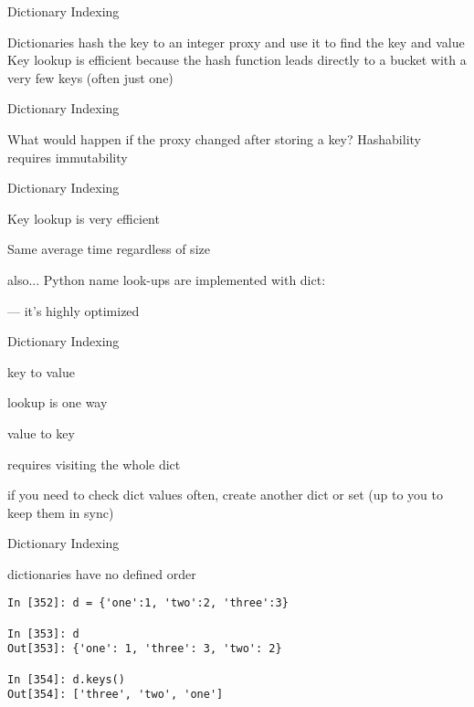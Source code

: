 \documentclass{beamer}
\begin{document}
\begin{frame}[fragile]{Dictionary Indexing}

\vfill
{\Large
Dictionaries hash the key to an integer proxy and use it to find the key and value
}
\vfill
{\Large
Key lookup is efficient because the hash function leads directly to a bucket with a very few keys (often just one)
}
\vfill
\end{frame} 

\begin{frame}[fragile]{Dictionary Indexing}

\vfill
{\Large
What would happen if the proxy changed after storing a key?
}
\vfill
{\Large
Hashability requires immutability}
\vfill
\end{frame} 

\begin{frame}[fragile]{Dictionary Indexing}

\vfill
{\Large

Key lookup is very efficient

\vfill
Same average time regardless of size
}

\vfill
also... Python name look-ups are implemented with dict:

 --- it’s highly optimized
\end{frame} 


\begin{frame}[fragile]{Dictionary Indexing}

\vfill
{\Large
{\center 

key to value

lookup is one way

}}
\vfill
{\Large
{\center 

value to key

requires visiting the whole dict

}}

\vfill
{\Large
if you need to check dict values often, create another dict or set (up to you to keep them in sync)

}
\vfill
\end{frame} 

\begin{frame}[fragile]{Dictionary Indexing}

\vfill
{\Large
dictionaries have no defined order
}
\vfill
\begin{verbatim}
In [352]: d = {'one':1, 'two':2, 'three':3}

In [353]: d
Out[353]: {'one': 1, 'three': 3, 'two': 2}

In [354]: d.keys()
Out[354]: ['three', 'two', 'one']
\end{verbatim}
\vfill
\end{frame} 
\end{document}
